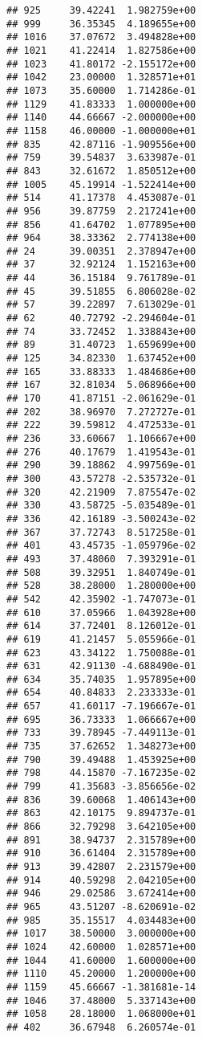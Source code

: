 \documentclass[
]{article}
\begin{document}
\begin{verbatim}
## 925     39.42241  1.982759e+00
## 999     36.35345  4.189655e+00
## 1016    37.07672  3.494828e+00
## 1021    41.22414  1.827586e+00
## 1023    41.80172 -2.155172e+00
## 1042    23.00000  1.328571e+01
## 1073    35.60000  1.714286e-01
## 1129    41.83333  1.000000e+00
## 1140    44.66667 -2.000000e+00
## 1158    46.00000 -1.000000e+01
## 835     42.87116 -1.909556e+00
## 759     39.54837  3.633987e-01
## 843     32.61672  1.850512e+00
## 1005    45.19914 -1.522414e+00
## 514     41.17378  4.453087e-01
## 956     39.87759  2.217241e+00
## 856     41.64702  1.077895e+00
## 964     38.33362  2.774138e+00
## 24      39.00351  2.378947e+00
## 37      32.92124  1.152163e+00
## 44      36.15184  9.761789e-01
## 45      39.51855  6.806028e-02
## 57      39.22897  7.613029e-01
## 62      40.72792 -2.294604e-01
## 74      33.72452  1.338843e+00
## 89      31.40723  1.659699e+00
## 125     34.82330  1.637452e+00
## 165     33.88333  1.484686e+00
## 167     32.81034  5.068966e+00
## 170     41.87151 -2.061629e-01
## 202     38.96970  7.272727e-01
## 222     39.59812  4.472533e-01
## 236     33.60667  1.106667e+00
## 276     40.17679  1.419543e-01
## 290     39.18862  4.997569e-01
## 300     43.57278 -2.535732e-01
## 320     42.21909  7.875547e-02
## 330     43.58725 -5.035489e-01
## 336     42.16189 -3.500243e-02
## 367     37.72743  8.517258e-01
## 401     43.45735 -1.059796e-02
## 493     37.48060  7.393291e-01
## 508     39.32951  1.840749e-01
## 528     38.28000  1.280000e+00
## 542     42.35902 -1.747073e-01
## 610     37.05966  1.043928e+00
## 614     37.72401  8.126012e-01
## 619     41.21457  5.055966e-01
## 623     43.34122  1.750088e-01
## 631     42.91130 -4.688490e-01
## 634     35.74035  1.957895e+00
## 654     40.84833  2.233333e-01
## 657     41.60117 -7.196667e-01
## 695     36.73333  1.066667e+00
## 733     39.78945 -7.449113e-01
## 735     37.62652  1.348273e+00
## 790     39.49488  1.453925e+00
## 798     44.15870 -7.167235e-02
## 799     41.35683 -3.856656e-02
## 836     39.60068  1.406143e+00
## 863     42.10175  9.894737e-01
## 866     32.79298  3.642105e+00
## 891     38.94737  2.315789e+00
## 910     36.61404  2.315789e+00
## 913     39.42807  2.231579e+00
## 914     40.59298  2.042105e+00
## 946     29.02586  3.672414e+00
## 965     43.51207 -8.620691e-02
## 985     35.15517  4.034483e+00
## 1017    38.50000  3.000000e+00
## 1024    42.60000  1.028571e+00
## 1044    41.60000  1.600000e+00
## 1110    45.20000  1.200000e+00
## 1159    45.66667 -1.381681e-14
## 1046    37.48000  5.337143e+00
## 1058    28.18000  1.068000e+01
## 402     36.67948  6.260574e-01

\end{verbatim}
\end{document}
